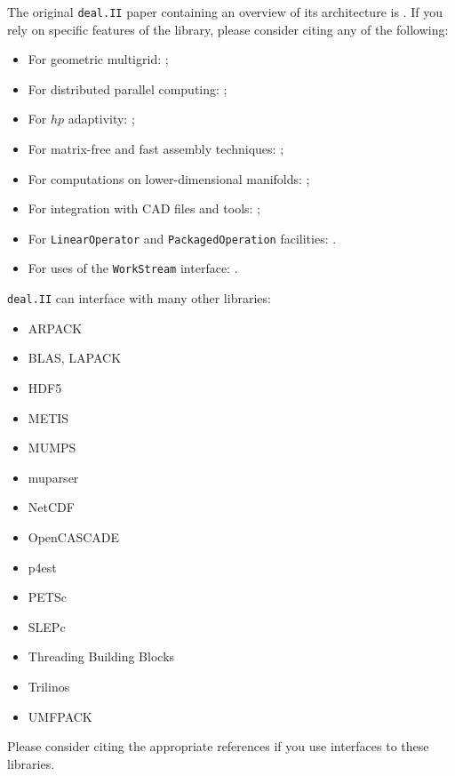 \documentclass{ansarticle-preprint}
\newcommand{\specialword}[1]{\texttt{#1}}
\newcommand{\dealii}{{\specialword{deal.II}}}
\begin{document}
The original \texttt{\dealii{}} paper containing an overview of its
architecture is \cite{BangerthHartmannKanschat2007}. If you rely on specific
features of the library, please consider citing any of the following:
\begin{itemize}
 \item For geometric multigrid: \cite{Kanschat2004,JanssenKanschat2011};
 \item For distributed parallel computing: \cite{BangerthBursteddeHeisterKronbichler11};
 \item For $hp$ adaptivity: \cite{BangerthKayserHerold2007};
 \item For matrix-free and fast assembly techniques:
   \cite{KronbichlerKormann2012};
 \item For computations on lower-dimensional manifolds:
   \cite{DeSimoneHeltaiManigrasso2009};
 \item For integration with CAD files and tools:
   \cite{HeltaiMola2015};
 \item For \texttt{LinearOperator} and \texttt{PackagedOperation} facilities:
   \cite{MaierBardelloniHeltai-2015-a}.
 \item For uses of the \texttt{WorkStream} interface:
   \cite{TKB16}.
\end{itemize}

\dealii{} can interface with many other libraries:
\begin{itemize}
\item ARPACK \cite{arpack}
\item BLAS, LAPACK
\item HDF5 \cite{hdf5}
\item METIS \cite{karypis1998fast}
\item MUMPS \cite{ADE00,MUMPS:1,MUMPS:2,mumps-web-page}
\item muparser \cite{muparser-web-page}
\item NetCDF \cite{rew1990netcdf}
\item OpenCASCADE \cite{opencascade-web-page}
\item p4est \cite{p4est}
\item PETSc \cite{petsc-user-ref,petsc-web-page}
\item SLEPc \cite{Hernandez:2005:SSF}
\item Threading Building Blocks \cite{Rei07}
\item Trilinos \cite{trilinos,trilinos-web-page}
\item UMFPACK \cite{umfpack}
\end{itemize}
Please consider citing the appropriate references if you use interfaces to these
libraries.
\end{document}

